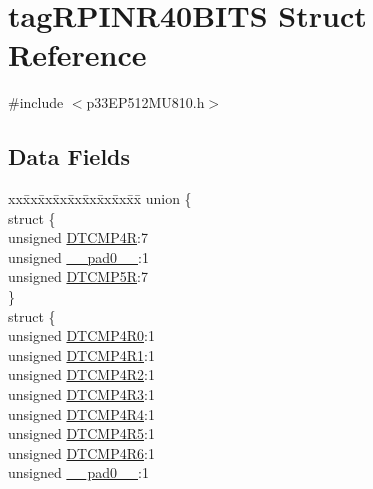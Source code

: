 \hypertarget{structtag_r_p_i_n_r40_b_i_t_s}{}\section{tag\+R\+P\+I\+N\+R40\+B\+I\+TS Struct Reference}
\label{structtag_r_p_i_n_r40_b_i_t_s}


{\ttfamily \#include $<$p33\+E\+P512\+M\+U810.\+h$>$}

\subsection*{Data Fields}
\begin{DoxyCompactItemize}
\item 
\begin{tabbing}
xx\=xx\=xx\=xx\=xx\=xx\=xx\=xx\=xx\=\kill
union \{\\
\>struct \{\\
\>\>unsigned \hyperlink{structtag_r_p_i_n_r40_b_i_t_s_a9ff9ad4a0b0c6b7b50011835d60c8446}{DTCMP4R}:7\\
\>\>unsigned \hyperlink{structtag_r_p_i_n_r40_b_i_t_s_adf71f3d8410c1f1dbbc96680a92c49af}{\_\_pad0\_\_}:1\\
\>\>unsigned \hyperlink{structtag_r_p_i_n_r40_b_i_t_s_ae7d40f2398d7f4fb768986b7453fb771}{DTCMP5R}:7\\
\>\} \\
\>struct \{\\
\>\>unsigned \hyperlink{structtag_r_p_i_n_r40_b_i_t_s_a021851bffc639fa6f780c125e545c9a7}{DTCMP4R0}:1\\
\>\>unsigned \hyperlink{structtag_r_p_i_n_r40_b_i_t_s_a4f77f0736e95593e65e83e6288b6e83f}{DTCMP4R1}:1\\
\>\>unsigned \hyperlink{structtag_r_p_i_n_r40_b_i_t_s_a19300fb23d412ffea6c10f512310ba65}{DTCMP4R2}:1\\
\>\>unsigned \hyperlink{structtag_r_p_i_n_r40_b_i_t_s_ac7d2020d38a75fece7136835bc7b1708}{DTCMP4R3}:1\\
\>\>unsigned \hyperlink{structtag_r_p_i_n_r40_b_i_t_s_a8bb1930adfbd76a65bbe3e0e4b8fc302}{DTCMP4R4}:1\\
\>\>unsigned \hyperlink{structtag_r_p_i_n_r40_b_i_t_s_a280864f640dc787fa9294c58d2ca3efa}{DTCMP4R5}:1\\
\>\>unsigned \hyperlink{structtag_r_p_i_n_r40_b_i_t_s_a430613316f84ee7f95a1f3cbcac6bc41}{DTCMP4R6}:1\\
\>\>unsigned \hyperlink{structtag_r_p_i_n_r40_b_i_t_s_adf71f3d8410c1f1dbbc96680a92c49af}{\_\_pad0\_\_}:1\\

\end{tabbing}
\end{DoxyCompactItemize}
